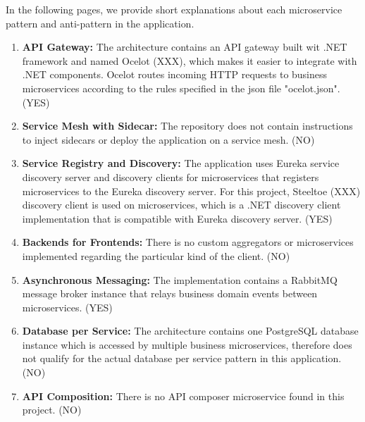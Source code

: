 \documentclass{Configuration_Files/PoliMi3i_thesis}
\begin{document}
In the following pages, we provide short explanations about each microservice pattern and anti-pattern in the application.

\begin{enumerate}
    \item \textbf{API Gateway:} The architecture contains an API gateway built wit .NET framework and named Ocelot (XXX), which makes it easier to integrate with .NET components.
    Ocelot routes incoming HTTP requests to business microservices according to the rules specified in the json file "ocelot.json". (YES)
    
    \item \textbf{Service Mesh with Sidecar:} The repository does not contain instructions to inject sidecars or deploy the application on a service mesh. (NO)
    
    \item \textbf{Service Registry and Discovery:} The application uses Eureka service discovery server and discovery clients for microservices that registers microservices to the Eureka discovery server.
    For this project, Steeltoe (XXX) discovery client is used on microservices, which is a .NET discovery client implementation that is compatible with Eureka discovery server. (YES)
    
    \item \textbf{Backends for Frontends:} There is no custom aggregators or microservices implemented regarding the particular kind of the client. (NO)
    
    \item \textbf{Asynchronous Messaging:} The implementation contains a RabbitMQ message broker instance that relays business domain events between microservices. (YES)
    
    \item \textbf{Database per Service:} The architecture contains one PostgreSQL database instance which is accessed by multiple business microservices, therefore does not qualify for the actual database per service pattern in this application. (NO)
    
    \item \textbf{API Composition:} There is no API composer microservice found in this project. (NO)
    

\end{enumerate}
\end{document}
